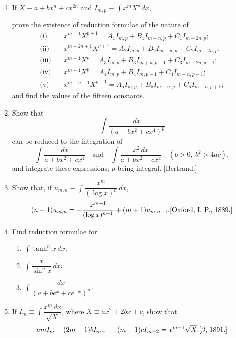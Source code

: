 \documentclass[11pt, a4paper]{article}
\newcommand{\source}[1]{\hfill\textnormal{[#1]}}
\begin{document}
\begin{enumerate}[leftmargin=2em]
and hence that
\[
\int_0^{\pi/2}\dfrac{\sin nx}{\sin x}=\dfrac{\pi}{2}, \text{ if $n$ be odd,}
\]
\[
=2\left(1-\dfrac13+\dfrac15-\dfrac17+\dots+(-1)^{\frac n2+1}\dfrac{1}{n-1}\right), \text{ if $n$ be even.}
\]

\item If $X\equiv a+bx^n+cx^{2n}$ and $I_{m,p}\equiv\displaystyle\int x^mX^p\,dx$,

prove the existence of reduction formulae of the nature of
\begin{align*}
\text{(i)}\quad & x^{m+1}X^{p+1}=A_1I_{m,p}+B_1I_{m+n,p}+C_1I_{m+2n,p};\\
\text{(ii)}\quad & x^{m-2n+1}X^{p+1}=A_2I_{m,p}+B_2I_{m-n,p}+C_2I_{m-2n,p};\\
\text{(iii)}\quad & x^{m+1}X^p=A_3I_{m,p}+B_3I_{m+n,p-1}+C_3I_{m+2n,p-1};\\
\text{(iv)}\quad & x^{m+1}X^p=A_4I_{m,p}+B_4I_{m,p-1}+C_4I_{m+n,p-1};\\
\text{(v)}\quad & x^{m-n+1}X^{p+1}=A_5I_{m,p}+B_5I_{m-n,p}+C_5I_{m-n,p+1};
\end{align*}
and find the values of the fifteen constants.

\item Show that
\[
\int \dfrac{dx}{(a+bx^2+cx^4)^p}
\]
can be reduced to the integration of
\[
\int \dfrac{dx}{a+bx^2+cx^4} \quad\text{and}\quad \int \dfrac{x^2\,dx}{a+bx^2+cx^4} \quad (b>0,\ b^2>4ac),
\]
and integrate these expressions; $p$ being integral. \source{Bertrand.}

\item Show that, if $u_{m,n}\equiv\displaystyle\int \dfrac{x^m}{(\log x)^n}\,dx$,
\[
(n-1)u_{m,n}=-\dfrac{x^{m+1}}{(\log x)^{n-1}}+(m+1)u_{m,n-1}. \source{Oxford, I. P., 1889.}
\]

\item Find reduction formulae for
\begin{enumerate}[label=(\alph*)]
\item $\displaystyle\int \tanh^nx\,dx$;
\item $\displaystyle\int \dfrac{x}{\sin^nx}\,dx$;
\item $\displaystyle\int \dfrac{dx}{(a+be^x+ce^{-x})^n}$.
\end{enumerate}

\item If $I_m\equiv\displaystyle\int \dfrac{x^m\,dx}{\sqrt X}$, where $X\equiv ax^2+2bx+c$, show that
\[
amI_m+(2m-1)bI_{m-1}+(m-1)cI_{m-2}=x^{m-1}\sqrt X. \source{$\beta$, 1891.}
\]


\end{enumerate}
\end{document}
